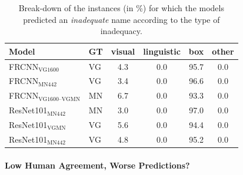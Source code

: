 \begin{table}[t]
	\centering
	\small
	\begin{tabular}{l|l|c@{~}c@{~}c@{~}c}
		\toprule
		{Model} &  GT & visual &  linguistic &  box &  other \\
		\midrule
		FRCNN$_{\text{VG1600}}$ & VG &             4.3 &                 0.0 &                  95.7 &            0.0 \\
		FRCNN$_{\text{MN442}}$ & VG &             3.4 &                 0.0 &                  96.6 &            0.0 \\
		\midrule
		FRCNN$_{\text{VG1600--VGMN}}$ & MN &             6.7 &                 0.0 &                  93.3 &            0.0 \\
		\midrule
		ResNet101$_{\text{MN442}}$ & MN &             3.0 &                 0.0 &                  97.0 &            0.0 \\
		ResNet101$_{\text{VGMN}}$ & VG &             5.6 &                 0.0 &                  94.4 &            0.0 \\
		ResNet101$_{\text{MN442}}$ & VG &             4.8 &                 0.0 &                  95.2 &            0.0 \\
		\bottomrule
	\end{tabular}
	\caption{Break-down of the instances (in \%) for which the models predicted an \textit{inadequate} name according to the type of inadequacy.  \label{tab:exp_inadequacy}}
\end{table}
%	

\paragraph{Low Human Agreement, Worse Predictions?}


